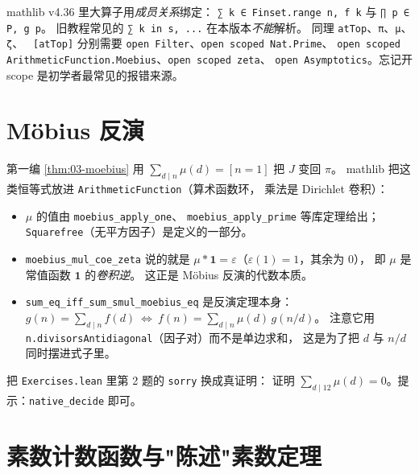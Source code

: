 \begin{warnbox}[一个必须记住的语法细节]
mathlib v4.36 里大算子用\emph{成员关系}绑定：
\texttt{∑ k ∈ Finset.range n, f k} 与 \texttt{∏ p ∈ P, g p}。
旧教程常见的 \texttt{∑ k in s, ...} 在本版本\emph{不能}解析。
同理 \texttt{atTop}、\texttt{π}、\texttt{μ}、\texttt{ζ}、
\texttt{~[atTop]} 分别需要
\texttt{open Filter}、\texttt{open scoped Nat.Prime}、
\texttt{open scoped ArithmeticFunction.Moebius}、\texttt{open scoped zeta}、
\texttt{open Asymptotics}。忘记开 scope 是初学者最常见的报错来源。
\end{warnbox}

\section{M\"obius 反演}
\label{sec:07-moebius}

第一编 \cref{thm:03-moebius} 用 $\sum_{d\mid n}\mu(d)=[n=1]$ 把 $J$ 变回 $\pi$。
mathlib 把这类恒等式放进 \texttt{ArithmeticFunction}（算术函数环，
乘法是 Dirichlet 卷积）：


\begin{itemize}
  \item $\mu$ 的值由 \texttt{moebius\_apply\_one}、
        \texttt{moebius\_apply\_prime} 等库定理给出；
        \texttt{Squarefree}（无平方因子）是定义的一部分。
  \item \texttt{moebius\_mul\_coe\_zeta} 说的就是
        $\mu * \mathbf{1} = \varepsilon$（$\varepsilon(1)=1$，其余为 $0$），
        即 $\mu$ 是常值函数 $\mathbf{1}$ 的\emph{卷积逆}。
        这正是 M\"obius 反演的代数本质。
  \item \texttt{sum\_eq\_iff\_sum\_smul\_moebius\_eq} 是反演定理本身：
        $g(n)=\sum_{d\mid n}f(d)\ \iff\ f(n)=\sum_{d\mid n}\mu(d)\,g(n/d)$。
        注意它用 \texttt{n.divisorsAntidiagonal}（因子对）而不是单边求和，
        这是为了把 $d$ 与 $n/d$ 同时摆进式子里。
\end{itemize}

\begin{exercise}
把 \texttt{Exercises.lean} 里第 2 题的 \texttt{sorry} 换成真证明：
证明 $\sum_{d\mid 12}\mu(d)=0$。提示：\texttt{native\_decide} 即可。
\end{exercise}

\section{素数计数函数与"陈述"素数定理}
\label{sec:07-pnt}

